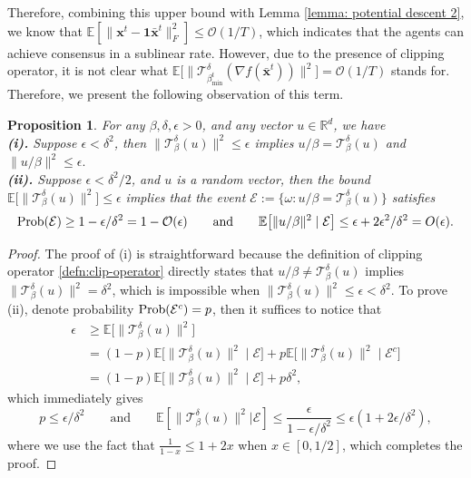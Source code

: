 \documentclass{article}
\newtheorem{proposition}[theorem]{Proposition}
\newcommand{\cO}{\mathcal{O}}
\newcommand{\cT}{\mathcal{T}}
\newcommand{\bxt}{\mathbf{x}^t}
\newcommand{\bbxt}{\bar{\mathbf{x}}^t}
\newcommand{\RR}{\mathbb{R}}
\newcommand{\EE}{\mathbb{E}}
\newcommand{\bone}{\mathbf{1}}
\begin{document}
\noindent Therefore, combining this upper bound with Lemma \ref{lemma: potential descent 2}, we know that $\EE[\|\bxt-\bone\bbxt\|_F^2]\leq \cO(1/T)$, which indicates that the agents can achieve consensus in a sublinear rate. However, due to the presence of clipping operator, it is not clear what 
$\EE\big[\|\cT_{\beta_{\min}^t}^\delta(\nabla f(\bbxt))\|^2\big]=\cO(1/T)$ stands for. Therefore, we present the following observation of this term. 
\begin{proposition}\label{proposition:clip-measure}
For any $\beta,\delta,\epsilon>0$, and any vector $u\in\RR^d$, we have \vspace{0.1cm}\\
\emph{\bf (i).} Suppose $\epsilon<\delta^2$, then $\|\cT_\beta^\delta(u)\|^2\leq \epsilon$ implies $u/\beta = \cT_\beta^\delta(u)$ and $\|u/\beta\|^2 \leq \epsilon.$ \vspace{0.1cm}\\
\emph{\bf (ii).} Suppose $\epsilon<\delta^2/2$, and $u$ is a random vector, then the bound $\EE\big[\|\cT_\beta^\delta(u)\|^2\big]\leq \epsilon$ implies that the event  $\mathcal{E}:=\{\omega:u/\beta = \cT_\beta^\delta(u)\}$ satisfies 
$${\rm Prob}(\mathcal{E}) \geq  1-\epsilon/\delta^2 = 1-\cO(\epsilon) \qquad\mbox{and}\qquad \EE\big[\|u/\beta\|^2\mid\mathcal{E}\big]\leq \epsilon+ 2\epsilon^2/\delta^2 = O(\epsilon).$$
\end{proposition}
\begin{proof}
The proof of (i) is straightforward because the definition of clipping operator \ref{defn:clip-operator} directly states that  $u/\beta\neq\cT_\beta^\delta(u)$ implies $\|\cT_\beta^\delta(u)\|^2=\delta^2$, which is impossible when $\|\cT_\beta^\delta(u)\|^2\leq\epsilon<\delta^2$. To prove (ii), denote probability ${\rm Prob}(\mathcal{E}^c) = p$, then it suffices to notice that 
\begin{align*}
    \epsilon &\geq \EE\big[\|\cT_\beta^\delta(u)\|^2\big]\\
    & = (1-p)\EE\big[\|\cT_\beta^\delta(u)\|^2\mid\mathcal{E}\big] + p\EE\big[\|\cT_\beta^\delta(u)\|^2\mid\mathcal{E}^c\big] \\
    & =  (1-p)\EE\big[\|\cT_\beta^\delta(u)\|^2\mid\mathcal{E}\big] + p\delta^2,
\end{align*}
which immediately gives 
$$p\leq \epsilon/\delta^2\qquad\mbox{and}\qquad\EE[\|\cT_\beta^\delta(u)\|^2|\mathcal{E}]\leq \frac{\epsilon}{1-\epsilon/\delta^2}\leq \epsilon(1+2\epsilon/\delta^2),$$ where we use the fact that $\frac{1}{1-x}\leq 1+2x$ when $x\in[0,1/2]$, which completes the proof. 
\end{proof}
\end{document}
